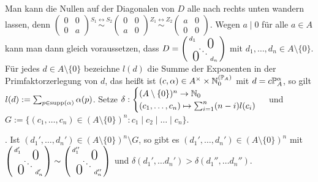 \documentclass[../../main.tex]{subfiles}
\begin{document}
\begin{cproof}
    Man kann die Nullen auf der Diagonalen von $D$ alle nach rechts unten wandern lassen, denn $\begin{pmatrix*}0&0\\ 0&a\end{pmatrix*}\stackrel{S_1\leftrightarrow S_2}{\sim}\begin{pmatrix*}0&0\\ a&0\end{pmatrix*}\stackrel{Z_1\leftrightarrow Z_2}{\sim}\begin{pmatrix*}a&0\\0&0\end{pmatrix*}$. Wegen $a\mid 0$ für alle $a\in A$ kann man dann gleich voraussetzen, dass $D= \left(
        \begin{smallmatrix}
            d_1 & & \llap{$\overset{\blap{\LARGE 0}}{~}$} \\
            & \ddots &\\
            \rlap{\tlap{\LARGE 0}} & & d_n
        \end{smallmatrix}
    \right)$ mit $d_1,\ldots ,d_n\in A\setminus\{0\}$. Für jedes $d\in A\setminus\{0\}$ bezeichne $l(d)$ die Summe der Exponenten in der Primfaktorzerlegung von $d$, das heißt ist $(c,\alpha)\in A^\times\times \expfam$ mit $d=c\P_A^\alpha$, so gilt $l(d):=\sum_{p\in\supp(\alpha)}\alpha(p)$. Setze $\delta:\begin{cases}(A\setminus\{0\})^n\to\N_0\\(c_1,\ldots ,c_n)\mapsto \sum_{i=1}^n(n-i)l(c_i)\end{cases}$ und $G:=\{(c_1,\ldots ,c_n)\in (A\setminus\{0\})^n: c_1\mid c_2\mid \ldots \mid c_n\}$.\\

    \begin{behbox}
        \hbeh{}. Ist $(d_1',\ldots ,d_n')\in (A\setminus\{0\})^n\setminus G$, so gibt es $(d_1',\ldots ,d_n')\in (A\setminus\{0\})^n$ mit $\left(
            \begin{smallmatrix}
                d'_1 & & \llap{$\overset{\blap{\LARGE 0}}{~}$} \\
                & \ddots &\\
                \rlap{\tlap{\LARGE 0}} & & d'_n
                \end{smallmatrix}\right)\sim \left(\begin{smallmatrix}
                d''_1 & & \llap{$\overset{\blap{\LARGE 0}}{~}$} \\
                & \ddots &\\
                \rlap{\tlap{\LARGE 0}} & & d''_n  
            \end{smallmatrix}
        \right)$ und $\delta(d_1',\ldots d_n')>\delta(d_1'',\ldots d_n'')$.\\


\end{behbox}
\end{cproof}
\end{document}
